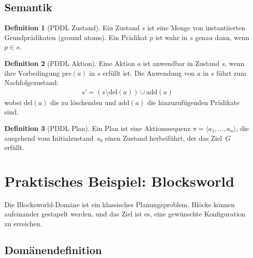 ﻿\documentclass[a4paper,12pt]{article}
\theoremstyle{definition}
\newtheorem{definition}{Definition}[section]
\begin{document}
\subsection{Semantik}

\begin{definition}[PDDL Zustand]
	Ein Zustand $s$ ist eine Menge von instantiierten Grundprädikaten (ground atoms). Ein Prädikat $p$ ist wahr in $s$ genau dann, wenn $p \in s$.
\end{definition}

\begin{definition}[PDDL Aktion]
	Eine Aktion $a$ ist anwendbar in Zustand $s$, wenn ihre Vorbedingung $\text{pre}(a)$ in $s$ erfüllt ist. Die Anwendung von $a$ in $s$ führt zum Nachfolgezustand:
	\begin{align}
	s' = (s \setminus \text{del}(a)) \cup \text{add}(a)
	\end{align}
	wobei $\text{del}(a)$ die zu löschenden und $\text{add}(a)$ die hinzuzufügenden Prädikate sind.
\end{definition}

\begin{definition}[PDDL Plan]
	Ein Plan ist eine Aktionssequenz $\pi = \langle a_1, \ldots, a_n \rangle$, die ausgehend
	vom Initialzustand~$s_0$ einen Zustand herbeiführt, der das Ziel~$G$ erfüllt.
\end{definition}

\section{Praktisches Beispiel: Blocksworld}

Die Blocksworld-Domäne ist ein klassisches Planungsproblem. Blöcke können aufeinander gestapelt werden, und das Ziel ist es, eine gewünschte Konfiguration zu erreichen.

\subsection{Domänendefinition}
\end{document}
